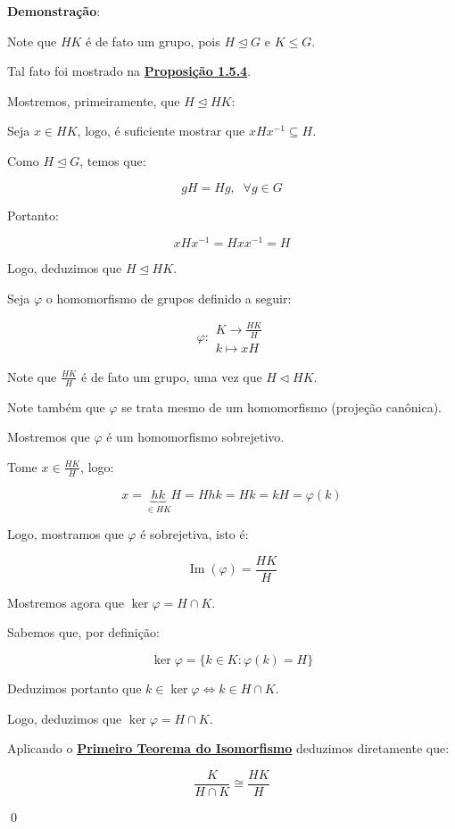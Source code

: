\documentclass[16pt,openany]{book}
\theoremstyle{definition}
\begin{document}
{\color{red}
\textbf{Demonstração}:

Note que $HK$ é de fato um grupo, pois $H\trianglelefteq G$ e $K\leq G$.

Tal fato foi mostrado na \hyperlink{prop154}{\textbf{Proposição 1.5.4}}. 

Mostremos, primeiramente, que $H \trianglelefteq HK$:

Seja $x\in HK$, logo, é suficiente mostrar que $xHx^{-1} \subseteq H$.

Como $H\trianglelefteq G$, temos que:

\[
gH = Hg, \; \; \forall g\in G
\]

Portanto:

\[
xHx^{-1} = Hxx^{-1} = H
\]

Logo, deduzimos que $H \trianglelefteq HK$.

Seja $\varphi$ o homomorfismo de grupos definido a seguir:

\[
\varphi: 
\begin{array}{c}
K \to \frac{HK}{H} \\
k \mapsto xH
\end{array}
\]

Note que $\frac{HK}{H}$ é de fato um grupo, uma vez que $H\triangleleft HK$.

Note também que $\varphi$ se trata mesmo de um homomorfismo (projeção canônica).

Mostremos que $\varphi$ é um homomorfismo sobrejetivo.

Tome $x\in \frac{HK}{H}$, logo:

\[
x = \underbrace{hk}_{\in HK}H = Hhk = Hk = kH = \varphi(k)
\]

Logo, mostramos que $\varphi$ é sobrejetiva, isto é:

\[
\operatorname{Im}(\varphi) = \frac{HK}{H}
\]

Mostremos agora que $\ker \varphi = H\cap K$.

Sabemos que, por definição:

\[
\ker \varphi = \{k\in K : \varphi(k) = H\}
\]

Deduzimos portanto que $k\in \ker\varphi \iff k\in H\cap K$.

Logo, deduzimos que $\ker \varphi = H\cap K$.

Aplicando o \hyperlink{primteoiso}{\textbf{Primeiro Teorema do Isomorfismo}} deduzimos diretamente que:

\[
\frac{K}{H\cap K} \cong \frac{HK}{H}
\]

\qed}
\end{document}
